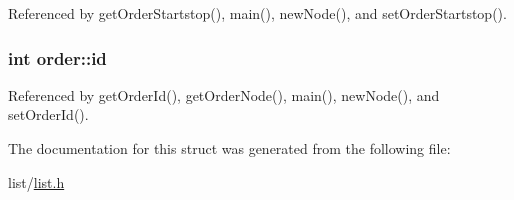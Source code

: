 Referenced by get\-Order\-Startstop(), main(), new\-Node(), and set\-Order\-Startstop().

\hypertarget{structorder_a4328e44fed73692e76eb23049f1d972a}{
\subsubsection[{id}]{\setlength{\rightskip}{0pt plus 5cm}int order\-::id}}\label{structorder_a4328e44fed73692e76eb23049f1d972a}


Referenced by get\-Order\-Id(), get\-Order\-Node(), main(), new\-Node(), and set\-Order\-Id().



The documentation for this struct was generated from the following file\-:\begin{DoxyCompactItemize}
\item 
list/\hyperlink{list_8h}{list.\-h}\end{DoxyCompactItemize}
